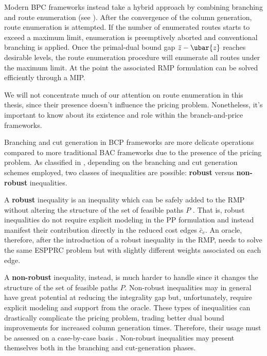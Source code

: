 Modern BPC frameworks instead take a hybrid approach by combining branching and route enumeration
(see \cite{pessoa2008, pessoa2009,contardo2014,pecin2017,pecin2017b,pessoa2020}).
After the convergence of the column generation, route enumeration is attempted.
If the number of enumerated routes starts to exceed a maximum limit, enumeration
is preemptively aborted and conventional branching is applied.
Once the primal-dual bound gap $\bar{z} - \ubar{z}$ reaches desirable levels, the route enumeration
procedure will enumerate all routes under the maximum limit.
At the point the associated RMP formulation can be solved efficiently through a MIP.

We will not concentrate much of our attention on route enumeration in this
thesis, since their presence doesn't influence the pricing problem.
Nonetheless, it's important to know about its existence and role within
the branch-and-price frameworks.

\medskip

Branching and cut generation in BCP frameworks are more delicate operations
compared to more traditional BAC frameworks due to the presence of the pricing problem.
As classified in \textcite{dearagao2003},
depending on the branching and cut generation schemes employed,
two classes of inequalities are possible:
\textbf{robust} versus \textbf{non-robust} inequalities.

A \textbf{robust} inequality is an inequality
which can be safely added to the RMP
without altering the structure of the set of feasible paths $P$ \parencite{fukasawa2006}.
That is,
robust inequalities do not require explicit modeling in the PP formulation
and instead manifest their contribution directly in the reduced cost edges $\bar{c}_e$.
An oracle, therefore,
after the introduction of a robust inequality in the RMP,
needs to solve the same ESPPRC problem but with slightly different weights associated on each edge.

A \textbf{non-robust} inequality, instead,
is much harder to handle since it changes the structure of the set of feasible paths $P$.
Non-robust inequalities may in general have great potential at reducing the integrality gap
but,
unfortunately, require explicit modeling and support from the oracle.
These types of inequalities can drastically complicate the pricing problem,
trading better dual bound improvements for increased column generation times.
Therefore, their usage must be assessed on a case-by-case basis \parencite{desaulniers2011}.
Non-robust inequalities may present themselves both in the branching and cut-generation phases.

